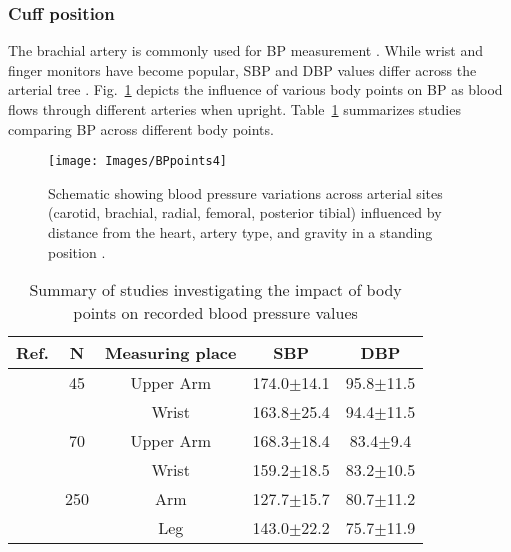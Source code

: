\documentclass[journal,article,moreauthors]{Definitions/mdpi}
\begin{document}
\subsubsection{Cuff position} 
The brachial artery is commonly used for BP measurement \citep{muntner2019measurement, Bilo2017}. While wrist and finger monitors have become popular, SBP and DBP values differ across the arterial tree \citep{ogedegbe2010principles}. Fig.~\ref{Fig: BPpoints} depicts the influence of various body points on BP as blood flows through different arteries when upright. Table~\ref{Tab: place} summarizes studies comparing BP across different body points.

\begin{figure}[tb]
\centering
\texttt{[image: Images/BPpoints4]}
\caption{Schematic showing blood pressure variations across arterial sites (carotid, brachial, radial, femoral, posterior tibial) influenced by distance from the heart, artery type, and gravity in a standing position \citep{Hinghofer-Szalkay2011-hu, Al-Qatatsheh2020-fh}.}\label{Fig: BPpoints}
\end{figure}

\begin{table}[tb]
\caption{Summary of studies investigating the impact of body points on recorded blood pressure values}\label{Tab: place}
\begin{center}
\begin{tabular}{rcccc}
\toprule
\textbf{Ref.} & \textbf{N}  &\textbf{Measuring place} & \textbf{SBP} & \textbf{DBP} \\
\hline
\citep{Kayrak2010-lk} & 45 & Upper Arm & 174.0$\pm$14.1 & 95.8$\pm$11.5 \\
 & & Wrist &  163.8$\pm$25.4  & 94.4$\pm$11.5 
\\\hline
\citep{Kayrak2010-lk} & 70 & Upper Arm & 168.3$\pm$18.4 & 83.4$\pm$9.4 \\
 & & Wrist &  159.2$\pm$18.5  & 83.2$\pm$10.5 
\\\hline
\citep{sareen2012comparison} & 250 & Arm & 127.7$\pm$15.7 & 80.7$\pm$11.2 \\
 & & Leg &  143.0$\pm$22.2  & 75.7$\pm$11.9 
\\
\bottomrule
\end{tabular}
\end{center}
\end{table}
\end{document}
